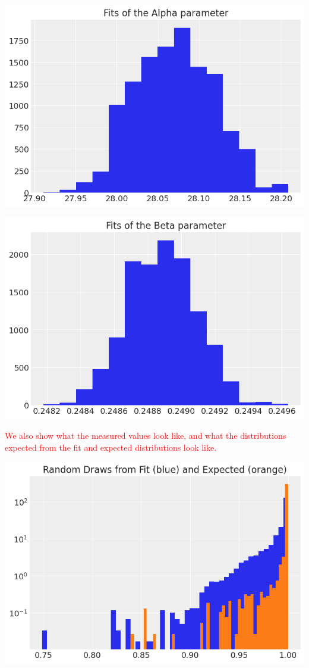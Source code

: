 \documentclass[prc, 12pt]{revtex4-1}
\begin{document}
\includegraphics[scale=0.5]{alpha}

\includegraphics[scale=0.5]{beta}

\textcolor{red}{We also show what the measured values look like, and what the distributions expected from the fit and expected distributions look like.}

\includegraphics[scale=0.5]{fit}
\end{document}
